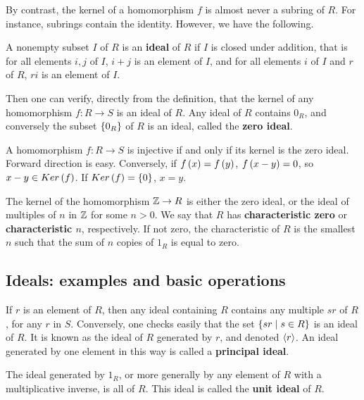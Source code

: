 By contrast, the kernel of a homomorphism $ f $ is almost never a subring of $ R $. For instance, subrings contain the identity. However, we have the following.


\begin{definition}
A nonempty subset $ I $ of $ R $ is an \textbf{ideal} of $ R $ if $ I $ is closed under addition, that is for all elements $ i, j $ of $ I $, $ i + j $ is an element of $ I $, and for all elements $ i $ of $ I $ and $ r $ of $ R $, $ ri $ is an element of $ I $.
\end{definition}

Then one can verify, directly from the definition, that the kernel of any homomorphism $ f : R \to S $ is an ideal of $ R $. Any ideal of $ R $ contains $ 0_R $, and conversely the subset $ \left\{ 0_R \right\} $ of $ R $ is an ideal, called the \textbf{zero ideal}.

\begin{note*}
A homomorphism $ f : R \to S $ is injective if and only if its kernel is the zero ideal. Forward direction is easy. Conversely, if $ f\left( x \right) = f\left( y \right) $, $ f\left( x - y \right) = 0 $, so $ x - y \in Ker\left( f \right) $. If $ Ker\left( f \right) = \left\{ 0 \right\} $, $ x = y $.
\end{note*}

The kernel of the homomorphism $ \mathbb{Z} \to R $ is either the zero ideal, or the ideal of multiples of $ n $ in $ \mathbb{Z} $ for some $ n > 0 $. We say that $ R $ has \textbf{characteristic zero} or \textbf{characteristic $ n $}, respectively. If not zero, the characteristic of $ R $ is the smallest $ n $ such that the sum of $ n $ copies of $ 1_R $ is equal to zero.

\subsection{Ideals: examples and basic operations}

If $ r $ is an element of $ R $, then any ideal containing $ R $ contains any multiple $ sr $ of $ R $, for any $ r $ in $ S $. Conversely, one checks easily that the set $ \left\{ sr \mid s \in R \right\} $ is an ideal of $ R $. It is known as the ideal of $ R $ generated by $ r $, and denoted $ \left\langle r \right\rangle $. An ideal generated by one element in this way is called a \textbf{principal ideal}.

\begin{note*}
The ideal generated by $ 1_R $, or more generally by any element of $ R $ with a multiplicative inverse, is all of $ R $. This ideal is called the \textbf{unit ideal} of $ R $.
\end{note*}

